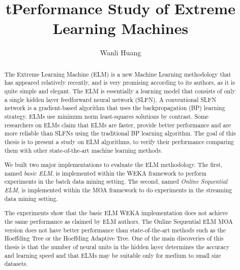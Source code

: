 \documentclass[a4paper, 14pt]{extarticle}
\title{tPerformance Study of Extreme Learning Machines}
\author{Wanli Huang}
\begin{document}
\maketitle
\newpage
\tableofcontents

\newpage
\begin{abstract}
\par The Extreme Learning Machine (ELM) is a new Machine Learning methodology that has appeared relatively recently, and is very promising according to its authors, as it is quite simple and elegant. The ELM is essentially a learning model that consists of only a single hidden layer feedforward neural network (SLFN). A conventional SLFN network is a gradient-based algorithm that uses the backpropagation (BP) learning strategy. ELMs use minimum norm least-squares solutions by contrast. Some researchers on ELMs claim that ELMs are faster, provide better performance and are more reliable than SLFNs using the traditional BP learning algorithm. The goal of this thesis is to present a study on ELM algorithms, to verify their performance comparing them with other state-of-the-art machine learning methods.
\par We built two major implementations to evaluate the ELM methodology. The first, named \emph{basic ELM}, is implemented within the WEKA framework to perform experiments in the batch data mining setting. The second, named \emph{Online Sequential ELM}, is implemented within the MOA framework to do experiments in the streaming data mining setting. 
\par The experiments show that the basic ELM WEKA implementation does not achieve the same performance as claimed by ELM authors. The Online Sequential ELM MOA version does not have better performance than state-of-the-art methods such as the Hoeffding Tree or the Hoeffding Adaptive Tree. One of the main discoveries of this thesis is that the number of neural units in the hidden layer determines the accuracy and learning speed and that ELMs may be suitable only for medium to small size datasets. 


\end{abstract}
\end{document}
